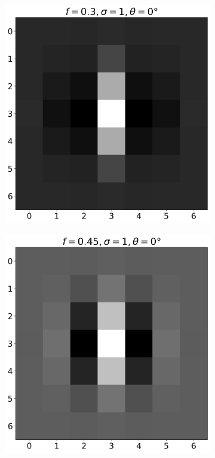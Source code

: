 \documentclass[12pt,a4paper, english]{article}
\begin{document}
\begin{figure}[!htbp]
\begin{subfigure}[b]{0.3\textwidth}
        \includegraphics[width=\textwidth]{img/K1.png}
      \end{subfigure}
      \begin{subfigure}[b]{0.3\textwidth}
        \includegraphics[width=\textwidth]{img/K2.png}
      \end{subfigure}


\end{figure}
\end{document}
